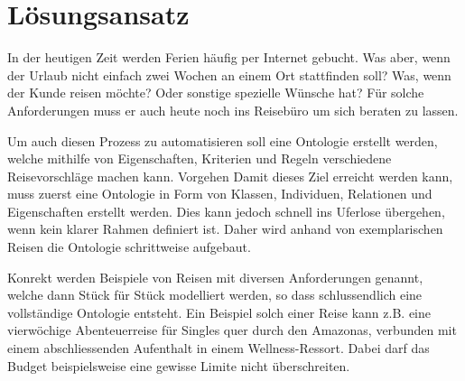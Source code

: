 \chapter{Lösungsansatz}
\label{chap:loesungsansatz}

In der heutigen Zeit werden Ferien häufig per Internet gebucht. Was aber, wenn der Urlaub nicht einfach zwei Wochen an einem Ort stattfinden soll? Was, wenn der Kunde reisen möchte? Oder sonstige spezielle Wünsche hat? Für solche Anforderungen muss er auch heute noch ins Reisebüro um sich beraten zu lassen.

Um auch diesen Prozess zu automatisieren soll eine Ontologie erstellt werden, welche mithilfe von Eigenschaften, Kriterien und Regeln verschiedene Reisevorschläge machen kann.
Vorgehen
Damit dieses Ziel erreicht werden kann, muss zuerst eine Ontologie in Form von Klassen, Individuen, Relationen und Eigenschaften erstellt werden. Dies kann jedoch schnell ins Uferlose übergehen, wenn kein klarer Rahmen definiert ist. Daher wird anhand von exemplarischen Reisen die Ontologie schrittweise aufgebaut.

Konrekt werden Beispiele von Reisen mit diversen Anforderungen genannt, welche dann Stück für Stück modelliert werden, so dass schlussendlich eine vollständige Ontologie entsteht. Ein Beispiel solch einer Reise kann z.B. eine vierwöchige Abenteuerreise für Singles quer durch den Amazonas, verbunden mit einem abschliessenden Aufenthalt in einem Wellness-Ressort. Dabei darf das Budget beispielsweise eine gewisse Limite nicht überschreiten.
